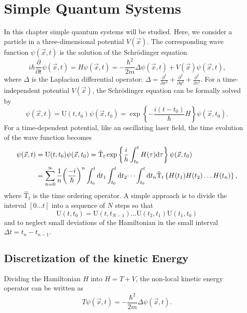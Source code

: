 \documentclass[twoside,        %
			   11pt,			%
               BCOR10mm,       %
               ngerman,english  %
               ]{scrartcl}
\begin{document}
\section{Simple Quantum Systems}\label{1}
In this chapter simple quantum systems will be studied. Here, we consider a particle in a three-dimensional potential $V(\vec{x})$. The corresponding wave function $\psi(\vec{x}, t)$ is the solution of the Schrödinger equation
\begin{equation}
  i\hbar \frac{\partial}{\partial t} \psi(\vec{x}, t) = H \psi(\vec{x}, t) = - \frac{\hbar^2}{2m}	\Delta \psi(\vec{x}, t)+  V(\vec{x}) \psi(\vec{x}, t) \text{,}
\end{equation}
where $\Delta$ is the Laplacian differential operator: $\Delta = \frac{\partial^2}{\partial x^2} +\frac{\partial^2}{\partial y^2} + \frac{\partial^2}{\partial z^2} $. For a time-independent potential $V(\vec{x})$, the Schrödinger equation can be formally solved by 
\begin{equation}
     \psi(\vec{x}, t) = \text{U}(t, t_0) \psi(\vec{x}, t_0)   = \exp \left\{ - \frac{i(t-t_0) }{\hbar} H \right\}  \psi(\vec{x}, t_0) \text{.}
\end{equation} 
For a time-dependent potential, like an oscillating laser field, the time evolution of the wave function becomes
\begin{align}
   \psi(\vec{x}, t) &= \text{U}(t, t_0) \psi(\vec{x}, t_0)  = \hat{\text{T}}_t  \exp \left\{ \frac{i}{h} \int_{t_0}^t H(\tau) \mathrm{d} \tau \right \}  \psi(\vec{x}, t_0)  \\
   &=  \sum_{n = 0}^\infty \frac{1}{n} {\left( \frac{- i}{\hbar} \right) }^n \int_{t_0}^t \mathrm{d} t_1\int_{t_0}^t \mathrm{d} t_2 \dots \int_{t_0}^t \mathrm{d} t_n \hat{\text{T}}_t \left\{ H(t_1)H(t_2) \dots H(t_n) \right\} \text{,} \nonumber
\end{align} 
where $\hat{\text{T}}_t$ is the time ordering operator. A simple approach is to divide the interval $[0 \dots t]$ into a sequence of $N$ steps so that
\begin{equation}
   \text{U}(t, t_0) = \text{U}(t, t_{N-1}) \dots \text{U}(t_2, t_1)\text{U}(t_1, t_0)
\end{equation}   and to neglect small deviations of the Hamiltonian in the small interval $\Delta t = t_n - t_{n-1}$.
   
\subsection{Discretization of the kinetic Energy}
Dividing the Hamiltonian $H$ into $H = T + V$, the non-local kinetic energy operator can be written as
\begin{equation}
    T \psi(\vec{x}, t) = - \frac{\hbar^2}{2m} \Delta \psi(\vec{x}, t) \text{.}
\end{equation}
    
\end{document}
